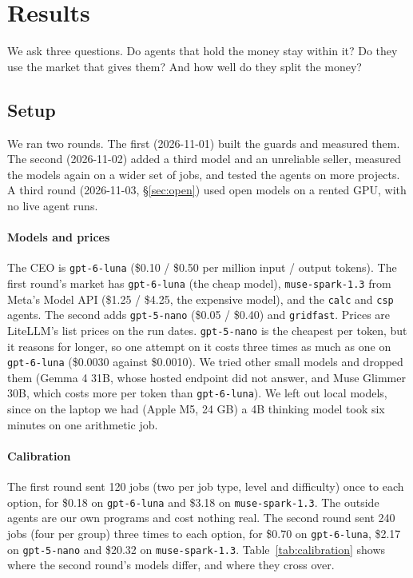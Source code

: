\section{Results}
\label{sec:evaluation}

We ask three questions. Do agents that hold the money stay within it? Do they use the market that \sys{} gives them?
And how well do they split the money?

\subsection{Setup}
We ran two rounds. The first (2026-11-01) built the guards and measured them. The second (2026-11-02) added a third
model and an unreliable seller, measured the models again on a wider set of jobs, and tested the agents on more
projects. A third round (2026-11-03, \S\ref{sec:open}) used open models on a rented GPU, with no live agent runs.

\paragraph{Models and prices} The CEO is \texttt{gpt-6-luna} (\$0.10 / \$0.50 per million input / output tokens). The
first round's market has \texttt{gpt-6-luna} (the cheap model), \texttt{muse-spark-1.3} from Meta's Model API (\$1.25 /
\$4.25, the expensive model), and the \texttt{calc} and \texttt{csp} agents. The second adds \texttt{gpt-5-nano}
(\$0.05 / \$0.40) and \texttt{gridfast}. Prices are LiteLLM's list prices on the run dates. \texttt{gpt-5-nano} is the
cheapest per token, but it reasons for longer, so one attempt on it costs three times as much as one on
\texttt{gpt-6-luna} (\$0.0030 against \$0.0010). We tried other small models and dropped them (Gemma 4 31B, whose
hosted endpoint did not answer, and Muse Glimmer 30B, which costs more per token than \texttt{gpt-6-luna}). We left out
local models, since on the laptop we had (Apple M5, 24 GB) a 4B thinking model took six minutes on one arithmetic job.

\paragraph{Calibration} The first round sent 120 jobs (two per job type, level and difficulty) once to each option, for
\$0.18 on \texttt{gpt-6-luna} and \$3.18 on \texttt{muse-spark-1.3}. The outside agents are our own programs and cost
nothing real. The second round sent 240 jobs (four per group) three times to each option, for \$0.70 on
\texttt{gpt-6-luna}, \$2.17 on \texttt{gpt-5-nano} and \$20.32 on \texttt{muse-spark-1.3}. Table~\ref{tab:calibration}
shows where the second round's models differ, and where they cross over.

